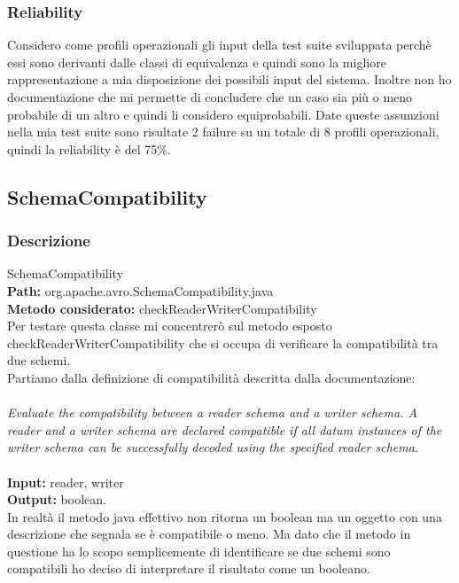 \documentclass[12pt, a4paper]{article}
\begin{document}
\subsubsection{Reliability}
Considero come profili operazionali gli input della test suite sviluppata perchè essi sono derivanti dalle classi di equivalenza
e quindi sono la migliore rappresentazione a mia disposizione dei possibili input del sistema. Inoltre non ho documentazione che
mi permette di concludere che un caso sia più o meno probabile di un altro e quindi li considero equiprobabili. Date queste 
assunzioni nella mia test suite sono risultate 2 failure su un totale di 8 profili operazionali, quindi la reliability è del 75\%.
\subsection{SchemaCompatibility}

\subsubsection{Descrizione}

SchemaCompatibility \\
\textbf{Path:} org.apache.avro.SchemaCompatibility.java \\
\textbf{Metodo considerato:} checkReaderWriterCompatibility \\

Per testare questa classe mi concentrerò sul metodo esposto checkReaderWriterCompatibility che
si occupa di verificare la compatibilità tra due schemi. \\
Partiamo dalla definizione di compatibilità descritta dalla documentazione: \\\\
\textit{Evaluate the compatibility between a reader schema and a writer schema. A
reader and a writer schema are declared compatible if all datum instances of
the writer schema can be successfully decoded using the specified reader 
schema.} \\ \\
\textbf{Input:} reader, writer \\
\textbf{Output:} boolean. \\
In realtà il metodo java effettivo non ritorna un boolean ma un oggetto con una descrizione che segnala se è 
compatibile o meno. Ma dato che il metodo in questione ha lo scopo semplicemente di identificare se due schemi sono compatibili
ho deciso di interpretare il risultato come un booleano.
\end{document}

